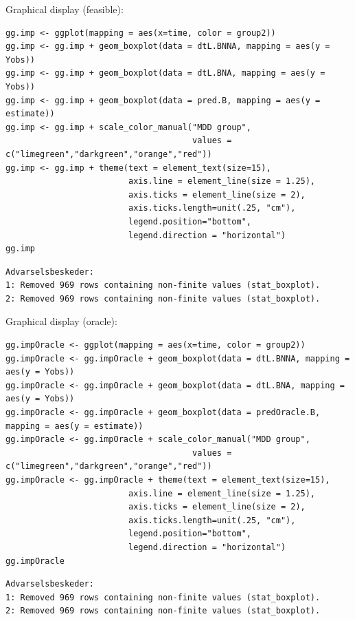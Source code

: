\documentclass[12pt]{article}
\begin{document}
Graphical display (feasible):
\lstset{language=r,label= ,caption= ,captionpos=b,numbers=none}
\begin{lstlisting}
gg.imp <- ggplot(mapping = aes(x=time, color = group2))
gg.imp <- gg.imp + geom_boxplot(data = dtL.BNNA, mapping = aes(y = Yobs))
gg.imp <- gg.imp + geom_boxplot(data = dtL.BNA, mapping = aes(y = Yobs))
gg.imp <- gg.imp + geom_boxplot(data = pred.B, mapping = aes(y = estimate))
gg.imp <- gg.imp + scale_color_manual("MDD group",
                                      values = c("limegreen","darkgreen","orange","red"))
gg.imp <- gg.imp + theme(text = element_text(size=15),
                         axis.line = element_line(size = 1.25),
                         axis.ticks = element_line(size = 2),
                         axis.ticks.length=unit(.25, "cm"),
                         legend.position="bottom",
                         legend.direction = "horizontal")
gg.imp
\end{lstlisting}

\begin{verbatim}
Advarselsbeskeder:
1: Removed 969 rows containing non-finite values (stat_boxplot). 
2: Removed 969 rows containing non-finite values (stat_boxplot).
\end{verbatim}


Graphical display (oracle):
\lstset{language=r,label= ,caption= ,captionpos=b,numbers=none}
\begin{lstlisting}
gg.impOracle <- ggplot(mapping = aes(x=time, color = group2))
gg.impOracle <- gg.impOracle + geom_boxplot(data = dtL.BNNA, mapping = aes(y = Yobs))
gg.impOracle <- gg.impOracle + geom_boxplot(data = dtL.BNA, mapping = aes(y = Yobs))
gg.impOracle <- gg.impOracle + geom_boxplot(data = predOracle.B, mapping = aes(y = estimate))
gg.impOracle <- gg.impOracle + scale_color_manual("MDD group",
                                      values = c("limegreen","darkgreen","orange","red"))
gg.impOracle <- gg.impOracle + theme(text = element_text(size=15),
                         axis.line = element_line(size = 1.25),
                         axis.ticks = element_line(size = 2),
                         axis.ticks.length=unit(.25, "cm"),
                         legend.position="bottom",
                         legend.direction = "horizontal")
gg.impOracle
\end{lstlisting}

\begin{verbatim}
Advarselsbeskeder:
1: Removed 969 rows containing non-finite values (stat_boxplot). 
2: Removed 969 rows containing non-finite values (stat_boxplot).
\end{verbatim}
\end{document}
